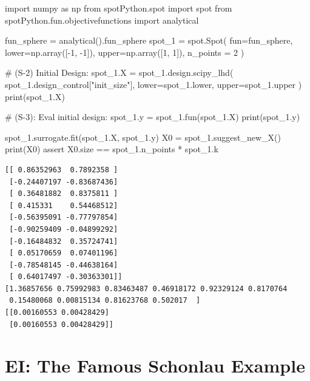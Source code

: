 \documentclass[
  letterpaper,
  DIV=11,
  numbers=noendperiod]{scrreprt}
\newenvironment{Shaded}{\begin{snugshade}}{\end{snugshade}}
\newcommand{\BuiltInTok}[1]{\textcolor[rgb]{0.00,0.23,0.31}{#1}}
\newcommand{\CommentTok}[1]{\textcolor[rgb]{0.37,0.37,0.37}{#1}}
\newcommand{\ControlFlowTok}[1]{\textcolor[rgb]{0.00,0.23,0.31}{#1}}
\newcommand{\DecValTok}[1]{\textcolor[rgb]{0.68,0.00,0.00}{#1}}
\newcommand{\ImportTok}[1]{\textcolor[rgb]{0.00,0.46,0.62}{#1}}
\newcommand{\NormalTok}[1]{\textcolor[rgb]{0.00,0.23,0.31}{#1}}
\newcommand{\OperatorTok}[1]{\textcolor[rgb]{0.37,0.37,0.37}{#1}}
\newcommand{\StringTok}[1]{\textcolor[rgb]{0.13,0.47,0.30}{#1}}
\begin{document}
\begin{Shaded}
\begin{Highlighting}[]
\ImportTok{import}\NormalTok{ numpy }\ImportTok{as}\NormalTok{ np}
\ImportTok{from}\NormalTok{ spotPython.spot }\ImportTok{import}\NormalTok{ spot}
\ImportTok{from}\NormalTok{ spotPython.fun.objectivefunctions }\ImportTok{import}\NormalTok{ analytical}

\NormalTok{fun\_sphere }\OperatorTok{=}\NormalTok{ analytical().fun\_sphere}
\NormalTok{spot\_1 }\OperatorTok{=}\NormalTok{ spot.Spot(}
\NormalTok{    fun}\OperatorTok{=}\NormalTok{fun\_sphere,}
\NormalTok{    lower}\OperatorTok{=}\NormalTok{np.array([}\OperatorTok{{-}}\DecValTok{1}\NormalTok{, }\OperatorTok{{-}}\DecValTok{1}\NormalTok{]),}
\NormalTok{    upper}\OperatorTok{=}\NormalTok{np.array([}\DecValTok{1}\NormalTok{, }\DecValTok{1}\NormalTok{]),}
\NormalTok{    n\_points }\OperatorTok{=} \DecValTok{2}
\NormalTok{)}

\CommentTok{\# (S{-}2) Initial Design:}
\NormalTok{spot\_1.X }\OperatorTok{=}\NormalTok{ spot\_1.design.scipy\_lhd(}
\NormalTok{    spot\_1.design\_control[}\StringTok{"init\_size"}\NormalTok{], lower}\OperatorTok{=}\NormalTok{spot\_1.lower, upper}\OperatorTok{=}\NormalTok{spot\_1.upper}
\NormalTok{)}
\BuiltInTok{print}\NormalTok{(spot\_1.X)}

\CommentTok{\# (S{-}3): Eval initial design:}
\NormalTok{spot\_1.y }\OperatorTok{=}\NormalTok{ spot\_1.fun(spot\_1.X)}
\BuiltInTok{print}\NormalTok{(spot\_1.y)}

\NormalTok{spot\_1.surrogate.fit(spot\_1.X, spot\_1.y)}
\NormalTok{X0 }\OperatorTok{=}\NormalTok{ spot\_1.suggest\_new\_X()}
\BuiltInTok{print}\NormalTok{(X0)}
\ControlFlowTok{assert}\NormalTok{ X0.size }\OperatorTok{==}\NormalTok{ spot\_1.n\_points }\OperatorTok{*}\NormalTok{ spot\_1.k}
\end{Highlighting}
\end{Shaded}

\begin{verbatim}
[[ 0.86352963  0.7892358 ]
 [-0.24407197 -0.83687436]
 [ 0.36481882  0.8375811 ]
 [ 0.415331    0.54468512]
 [-0.56395091 -0.77797854]
 [-0.90259409 -0.04899292]
 [-0.16484832  0.35724741]
 [ 0.05170659  0.07401196]
 [-0.78548145 -0.44638164]
 [ 0.64017497 -0.30363301]]
[1.36857656 0.75992983 0.83463487 0.46918172 0.92329124 0.8170764
 0.15480068 0.00815134 0.81623768 0.502017  ]
[[0.00160553 0.00428429]
 [0.00160553 0.00428429]]
\end{verbatim}

\hypertarget{ei-the-famous-schonlau-example}{%
\section{EI: The Famous Schonlau
Example}\label{ei-the-famous-schonlau-example}}
\end{document}
